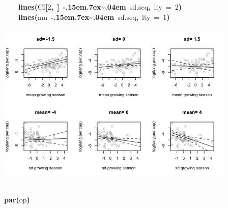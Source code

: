 \documentclass{article}
\makeatletter
\newcommand{\hlnumber}[1]{\textcolor[rgb]{0,0,0}{#1}}%
\newcommand{\hlfunctioncall}[1]{\textcolor[rgb]{.5,0,.33}{\textbf{#1}}}%
\newcommand{\hlkeyword}[1]{\textbf{#1}}%
\newcommand{\hlargument}[1]{\textcolor[rgb]{.69,.25,.02}{#1}}%
\newcommand{\hlsymbol}[1]{#1}%
\def\urltilda{\kern -.15em\lower .7ex\hbox{\~{}}\kern .04em}%
\newcommand{\hlstd}[1]{\textcolor[rgb]{0,0,0}{#1}}%
\newenvironment{kframe}{%
 \def\FrameCommand##1{\hskip\@totalleftmargin \hskip-\fboxsep
 \colorbox{shadecolor}{##1}\hskip-\fboxsep
     \hskip-\linewidth \hskip-\@totalleftmargin \hskip\columnwidth}%
 \MakeFramed {\advance\hsize-\width
   \@totalleftmargin\z@ \linewidth\hsize
   \@setminipage}}%
 {\par\unskip\endMakeFramed}
\newenvironment{knitrout}{}{} %
\makeatother
\begin{document}
\begin{knitrout}
{\begin{kframe}
\begin{flushleft}
\hlstd{}{\ }{\ }{\ }{\ }\hlfunctioncall{lines}\hlkeyword{(}\hlsymbol{CI}\hlkeyword{[}\hlnumber{2}\hlkeyword{,}{\ }\hlkeyword{]}{\ }\hlkeyword{\urltilda{}}{\ }\hlsymbol{sd.seq}\hlkeyword{,}{\ }\hlargument{lty}{\ }\hlargument{=}{\ }\hlnumber{2}\hlkeyword{)}\hspace*{\fill}\\
\hlstd{}{\ }{\ }{\ }{\ }\hlfunctioncall{lines}\hlkeyword{(}\hlsymbol{mu}{\ }\hlkeyword{\urltilda{}}{\ }\hlsymbol{sd.seq}\hlkeyword{,}{\ }\hlargument{lty}{\ }\hlargument{=}{\ }\hlnumber{1}\hlkeyword{)}\hspace*{\fill}\\
\hlstd{}\hlkeyword{\usebox{\hlnormalsizeboxclosebrace}}\mbox{}
\normalfont
\end{flushleft}
\includegraphics{lang-grow-fig} \begin{flushleft}
\ttfamily\noindent
\hspace*{\fill}\\
\hlstd{}\hlfunctioncall{par}\hlkeyword{(}\hlsymbol{op}\hlkeyword{)}\mbox{}
\normalfont
\end{flushleft}
\end{kframe}}
\end{knitrout}
\end{document}
